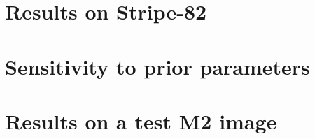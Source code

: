\documentclass[12pt]{article}
\begin{document}
\section{Results on Stripe-82}


\section{Sensitivity to prior parameters}


\section{Results on a test M2 image}



\end{document}
